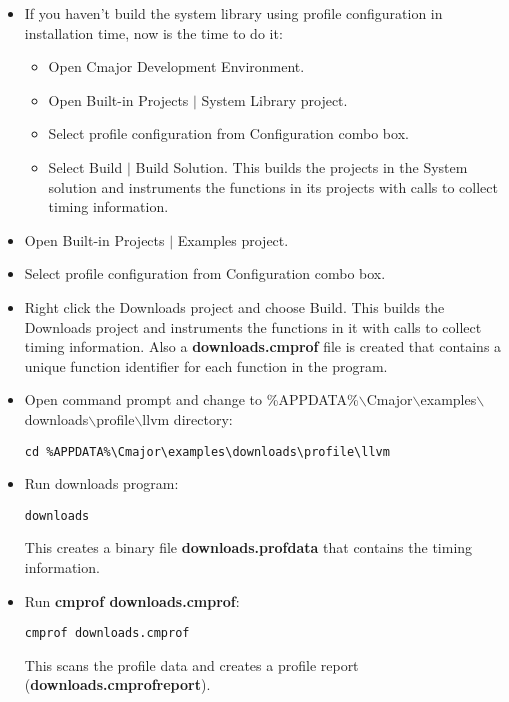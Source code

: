 \documentclass[oneside, a4paper, 11pt]{article}
\begin{document}
\begin{itemize}

\item
If you haven't build the system library using profile configuration
in installation time, now is the time to do it:

\begin{itemize}

\item
Open Cmajor Development Environment.

\item
Open Built-in Projects $|$ System Library project.

\item
Select profile configuration from Configuration combo box.

\item
Select Build $|$ Build Solution.
This builds the projects in the System solution and instruments
the functions in its projects with calls to collect timing information.

\end{itemize}

\item
Open Built-in Projects $|$ Examples project.

\item
Select profile configuration from Configuration combo box.

\item
Right click the Downloads project and choose Build.
This builds the Downloads project and instruments the functions in it
with calls to collect timing information.
Also a \textbf{downloads.cmprof} file is created that contains
a unique function identifier for each function in the program.

\item
Open command prompt and change to
\%APPDATA\%$\backslash$Cmajor$\backslash$examples$\backslash$downloads$\backslash$profile$\backslash$llvm
directory:
\begin{verbatim}
cd %APPDATA%\Cmajor\examples\downloads\profile\llvm
\end{verbatim}

\item
Run downloads program:
\begin{verbatim}
downloads
\end{verbatim}

This creates a binary file \textbf{downloads.profdata} that contains the
timing information.

\item
Run \textbf{cmprof downloads.cmprof}:
\begin{verbatim}
cmprof downloads.cmprof
\end{verbatim}

This scans the profile data and creates a  profile report (\textbf{downloads.cmprofreport}).

\end{itemize}
\end{document}
